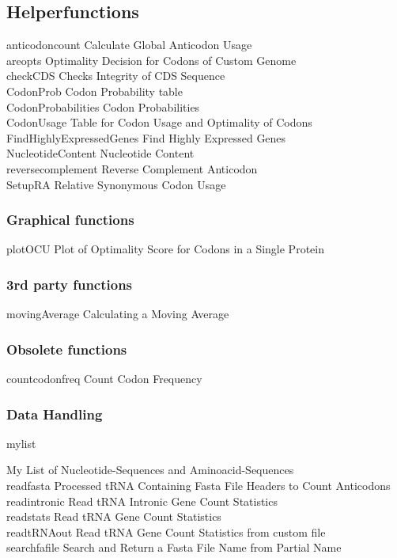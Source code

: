 \subsection{Helperfunctions}
anticodoncount	\quad Calculate Global Anticodon Usage \\
areopts	\quad Optimality Decision for Codons of Custom Genome \\
checkCDS	Checks \quad Integrity of CDS Sequence \\
CodonProb	\quad Codon Probability table \\
CodonProbabilities	\quad Codon Probabilities \\
CodonUsage	\quad Table for Codon Usage and Optimality of Codons \\
FindHighlyExpressedGenes	\quad Find Highly Expressed Genes \\			%
NucleotideContent	\quad Nucleotide Content \\							%
reversecomplement	\quad Reverse Complement Anticodon \\
SetupRA	\quad Relative Synonymous Codon Usage \\

\subsubsection{Graphical functions}
plotOCU	\quad Plot of Optimality Score for Codons in a Single Protein \\

\subsubsection{3rd party functions}
movingAverage	\quad Calculating a Moving Average \\

\subsubsection{Obsolete functions}
countcodonfreq	\quad Count Codon Frequency \\

\subsubsection{Data Handling}
\hypertarget{function:mylist}{mylist}	\quad My List of Nucleotide-Sequences and Aminoacid-Sequences \\
\hypertarget{function:readfasta}{readfasta}	\quad Processed tRNA Containing Fasta File Headers to Count Anticodons \\
\hypertarget{function:readintronic}{readintronic}	\quad Read tRNA Intronic Gene Count Statistics \\
\hypertarget{function:readstats}{readstats}	\quad Read tRNA Gene Count Statistics \\
\hypertarget{function:rtRNAo}{readtRNAout}	\quad Read tRNA Gene Count Statistics from custom file \\
\hypertarget{function:searchfafile}{searchfafile}	\quad Search and Return a Fasta File Name from Partial Name \\

